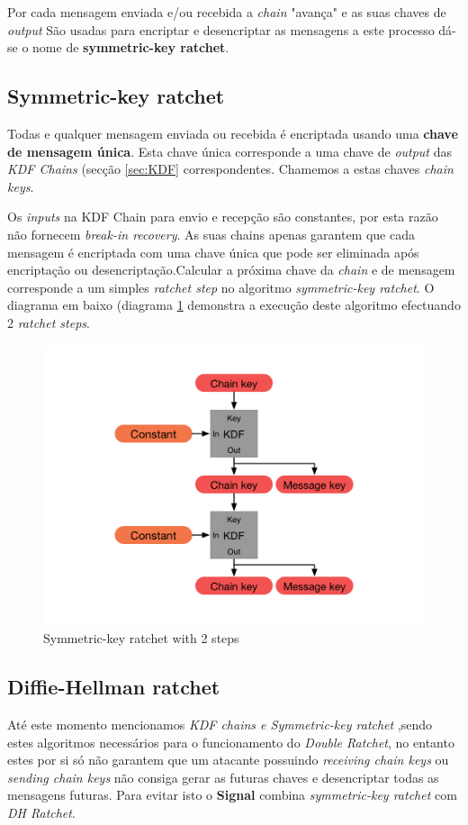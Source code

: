 Por cada mensagem enviada e/ou recebida a \emph{chain} "avança" e as suas chaves de \emph{output} São usadas para encriptar e desencriptar as mensagens a este processo dá-se o nome de \textbf{symmetric-key ratchet}.

\subsection{Symmetric-key ratchet}\label{sec:symkey}
Todas e qualquer mensagem enviada ou recebida é encriptada usando uma \textbf{chave de mensagem única}. Esta chave única corresponde a uma chave de \textit{output} das \textit{KDF Chains} (secção \ref{sec:KDF} correspondentes. Chamemos a estas chaves \textit{chain keys}.

Os \textit{inputs} na KDF Chain para envio e recepção são constantes, por esta razão não fornecem \textit{break-in recovery}. As suas chains apenas garantem que cada mensagem é encriptada com uma chave única que pode ser eliminada após encriptação ou desencriptação.Calcular a próxima chave da \textit{chain} e de mensagem corresponde a um simples \textit{ratchet step} no algoritmo \textit{symmetric-key ratchet}.
O diagrama em baixo (diagrama \ref{diagram:skRatchet} demonstra a execução deste algoritmo efectuando 2 \textit{ratchet steps}.

\begin{figure}[H]
\begin{center}
\includegraphics[width=12cm]{img/skRatchet.png}
\caption{Symmetric-key ratchet with 2 steps}
\label{diagram:skRatchet}
\centering
\end{center}
\end{figure}

\subsection{Diffie-Hellman ratchet}\label{sec:dhratchet}
Até este momento mencionamos \textit{KDF chains e Symmetric-key ratchet} ,sendo estes algoritmos necessários para o funcionamento do \textit{Double Ratchet}, no entanto estes por si só não garantem que um atacante possuindo \textit{receiving chain keys} ou \textit{sending chain keys} não consiga gerar as futuras chaves e desencriptar todas as mensagens futuras. Para evitar isto o \textbf{Signal} combina \textit{symmetric-key ratchet} com \textit{DH Ratchet}.

